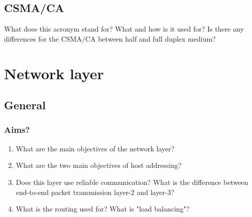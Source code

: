 \documentclass[11pt]{article}
\begin{document}
\subsection{CSMA/CA}
What does this acronym stand for? What and how is it used for? Is there any differences for the CSMA/CA between half and full duplex medium?

\section{Network layer}
\subsection{General}
\subsubsection{Aims?}
\begin{enumerate}
  \item What are the main objectives of the network layer?
  \item What are the two main objectives of host addressing?
  \item Does this layer use reliable communication? What is the difference between end-to-end packet transmission layer-2 and layer-3?
  \item What is the routing used for? What is "load balancing"?
\end{enumerate}
\end{document}
